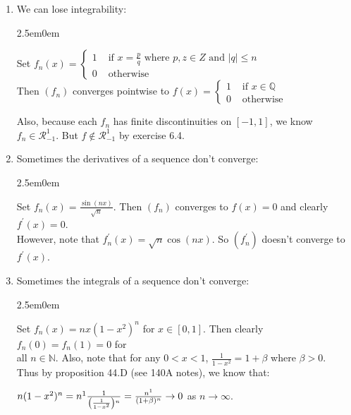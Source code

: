 \documentclass{book}
\newcommand{\exTwo}{%
   \color{RedViolet}%
   \fontsize{13}{15}\selectfont%
}
\newenvironment{myIndent}{%
   \begin{adjustwidth}{2.5em}{0em}%
}{%
   \end{adjustwidth}%
}
\newcommand{\retTwo}{\hfill\bigbreak}
\begin{document}
\begin{enumerate}
   \item We can lose integrability:
   
   {\begin{myIndent}\exTwo
      Set $f_n(x) = \left\{
      \begin{matrix}
         1 & \text{ if } x = \frac{p}{q} \text{ where } p, z \in Z \text{ and } |q| \leq n \\
         0 & \text{ otherwise }
      \end{matrix}\right.$\\
      Then $(f_n)$ converges pointwise to $f(x) = \left\{
      \begin{matrix}
         1 & \text{ if } x \in \mathbb{Q} \\
         0 & \text{ otherwise }
      \end{matrix}\right.$
      \retTwo

      Also, because each $f_n$ has finite discontinuities on $[-1, 1]$, we know\\ $f_n \in \mathscr{R}_{-1}^1$. But $f \notin \mathscr{R}_{-1}^{1}$ by exercise 6.4.\retTwo
   \end{myIndent}}

   \item Sometimes the derivatives of a sequence don't converge:
   
   {\begin{myIndent}\exTwo
      Set $f_n(x) = \frac{\sin(nx)}{\sqrt{n}}$. Then $(f_n)$ converges to $f(x) = 0$ and clearly $f^\prime(x) = 0$.\\ However, note that $f_n^\prime(x) = \sqrt{n}\cos(nx)$. So $(f_n^\prime)$ doesn't converge to $f^\prime(x)$.\retTwo
   \end{myIndent}}

   \item Sometimes the integrals of a sequence don't converge:
   
   {\begin{myIndent}\exTwo
      Set $f_n(x) = nx(1-x^2)^n$ for $x \in [0, 1]$. Then clearly $f_n(0) = f_n(1) = 0$ for\\ all $n \in \mathbb{N}$. Also, note that for any $0 < x < 1$, $\frac{1}{1-x^2} = 1 + \beta$ where $\beta > 0$.\\ Thus by proposition 44.D (see 140A notes), we know that:

      {\centering $ n(1-x^2)^n = n^1 \frac{1}{\left(\frac{1}{1-x^2}\right)\vphantom{{\frac{b}{b^2}}}^n} = \frac{n^1}{(1 + \beta)^n} \rightarrow 0 $ as $n \rightarrow \infty$. \retTwo\par}


\end{myIndent}}
\end{enumerate}
\end{document}
